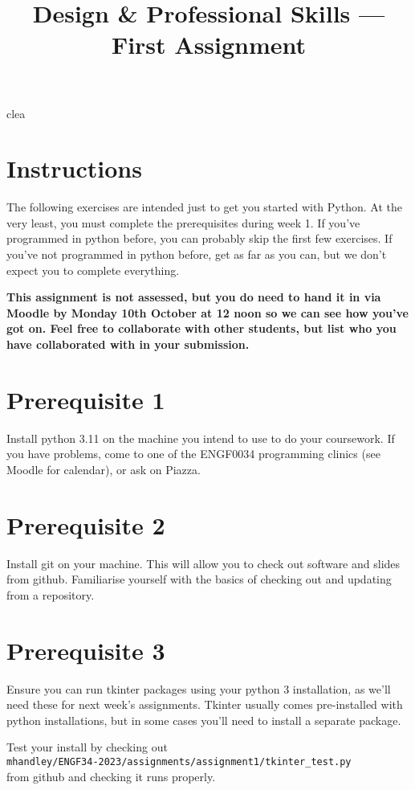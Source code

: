 clea\documentclass{article}
\title{Design \& Professional Skills --- First Assignment}
\author{}
\date{}
\begin{document}
\maketitle

\section*{Instructions}

The following exercises are intended just to get you started with
Python.  At the very least, you must complete the prerequisites during
week 1.  If you've programmed in python before, you can probably skip
the first few exercises.  If you've not programmed in python before,
get as far as you can, but we don't expect you to complete everything.

\textbf{This assignment is not assessed, but you do need to hand it in
  via Moodle by Monday 10th October at 12 noon so we can see how you've
  got on.  Feel free to collaborate with other students, but list who
  you have collaborated with in your submission.}

\section*{Prerequisite 1}

Install python 3.11 on the machine you intend to use to do your
coursework.  If you have problems, come to one of the ENGF0034
programming clinics (see Moodle for calendar), or ask on Piazza.

\section*{Prerequisite 2}

Install git on your machine.  This will allow you to check out
software and slides from github.  Familiarise yourself with the basics
of checking out and updating from a repository.

\section*{Prerequisite 3}

Ensure you can run tkinter packages using your python 3 installation,
as we'll need these for next week's assignments.  Tkinter usually
comes pre-installed with python installations, but in some cases you'll need to
install a separate package.

\vspace{0.1in}\noindent Test your install by checking out\\
\texttt{mhandley/ENGF34-2023/assignments/assignment1/tkinter\_test.py}\\
from github and checking it runs properly.
\end{document}
